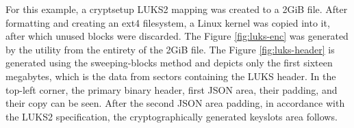 \documentclass[
  digital, %
  color,   %
  oneside, %
  lof,     %
  nolot,     %
]{fithesis4}
\begin{document}

For this example, a cryptsetup LUKS2 mapping was created to a 2GiB file.
After formatting and creating an ext4 filesystem, a Linux kernel was copied into it, after which unused blocks were discarded.
The Figure \ref{fig:luks-enc} was generated by the utility from the entirety of the 2GiB file.
The Figure \ref{fig:luks-header} is generated using the sweeping-blocks method and depicts only the first sixteen megabytes, which is the data from sectors containing the LUKS header.
In the top-left corner, the primary binary header, first JSON area, their padding, and their copy can be seen.
After the second JSON area padding, in accordance with the LUKS2 specification, the cryptographically generated keyslots area follows.\cite{broz22}
\end{document}
